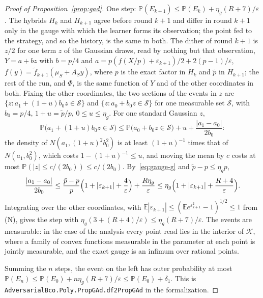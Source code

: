 \documentclass[11pt]{amsart}
\theoremstyle{definition}
\numberwithin{equation}{section}
\newcommand{\E}{\mathbb{E}}
\newcommand{\Prob}{\mathbb{P}}
\newcommand{\cK}{\mathcal{K}}
\begin{document}
\begin{proof}[Proof of Proposition~\ref{prop:gad}]
One step: $\Prob(E_{k+1})\le\Prob(E_k)+\eta_g(R+7)/\varepsilon$. The hybrids $H_k$ and $H_{k+1}$ agree before round $k+1$ and differ in round $k+1$ only in the gauge with which the learner forms its observation; the point fed to the strategy, and so the history, is the same in both. The dither of round $k+1$ is $z/2$ for one term $z$ of the Gaussian draws, read by nothing but that observation, $Y=a+bz$ with $b=p/4$ and $a=p(f(X/p)+\varepsilon_{k+1})/2+2(p-1)/\varepsilon$, $f(y)=\tilde f_{k+1}(\mu_S+A_Sy)$, where $p$ is the exact factor in $H_k$ and $\tilde p$ in $H_{k+1}$; the rest of the run, and $\Phi$, is the same function of $Y$ and of the other coordinates in both. Fixing the other coordinates, the two sections of the events in $z$ are $\{z:a_1+(1+u)b_0z\in\mathcal S\}$ and $\{z:a_0+b_0z\in\mathcal S\}$ for one measurable set $\mathcal S$, with $b_0=p/4$, $1+u=\tilde p/p$, $0\le u\le\eta_g$. For one standard Gaussian $z$,
\[
\Prob\bigl(a_1+(1+u)b_0z\in\mathcal S\bigr)\le\Prob\bigl(a_0+b_0z\in\mathcal S\bigr)+u+\frac{|a_1-a_0|}{2b_0}:
\]
the density of $N(a_1,(1+u)^2b_0^2)$ is at least $(1+u)^{-1}$ times that of $N(a_1,b_0^2)$, which costs $1-(1+u)^{-1}\le u$, and moving the mean by $c$ costs at most $\Prob(|z|\le c/(2b_0))\le c/(2b_0)$. By~\eqref{eq:gauge-g} and $\tilde p-p\le\eta_gp$,
\[
\frac{|a_1-a_0|}{2b_0}\le\frac{\tilde p-p}p\Bigl(1+|\varepsilon_{k+1}|+\frac4\varepsilon\Bigr)+\frac{R\eta_g}\varepsilon\le\eta_g\Bigl(1+|\varepsilon_{k+1}|+\frac{R+4}\varepsilon\Bigr).
\]
Integrating over the other coordinates, with $\E|\varepsilon_{k+1}|\le(\E e^{\varepsilon_{k+1}^2}-1)^{1/2}\le1$ from (N), gives the step with $\eta_g(3+(R+4)/\varepsilon)\le\eta_g(R+7)/\varepsilon$. The events are measurable: in the case of the analysis every point read lies in the interior of $\cK$, where a family of convex functions measurable in the parameter at each point is jointly measurable, and the exact gauge is an infimum over rational points.

Summing the $n$ steps, the event on the left has outer probability at most $\Prob(E_n)\le\Prob(E_0)+n\eta_g(R+7)/\varepsilon\le\Prob(E_0)+\delta_1$.
This is \texttt{AdversarialBco.Poly.PropGAd.df2PropGAd} in the formalization.
\end{proof}
\end{document}
